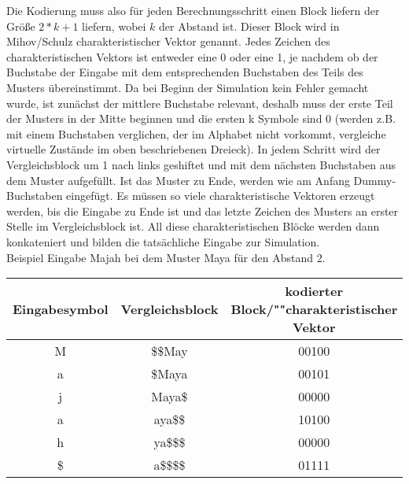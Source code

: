 Die Kodierung muss also für jeden Berechnungsschritt einen Block liefern der Größe $2*k+1$ liefern, wobei $k$ der Abstand ist. Dieser Block wird in Mihov/Schulz charakteristischer Vektor genannt. Jedes Zeichen des charakteristischen Vektors ist entweder eine 0 oder eine 1, je nachdem ob der Buchstabe der Eingabe mit dem entsprechenden Buchstaben des Teils des Musters übereinstimmt. Da bei Beginn der Simulation kein Fehler gemacht wurde, ist zunächst der mittlere Buchstabe relevant, deshalb muss der erste Teil der Musters in der Mitte beginnen und die ersten k Symbole sind 0 (werden z.B. mit einem Buchstaben verglichen, der im Alphabet nicht vorkommt, vergleiche virtuelle Zustände im oben beschriebenen Dreieck). In jedem Schritt wird der Vergleichsblock um 1 nach links geshiftet und mit dem nächsten Buchstaben aus dem Muster aufgefüllt. Ist das Muster zu Ende, werden wie am Anfang Dummy-Buchstaben eingefügt. Es müssen so viele charakteristische Vektoren erzeugt werden, bis die Eingabe zu Ende ist und das letzte Zeichen des Musters an erster Stelle im Vergleichsblock ist. All diese charakteristischen Blöcke werden dann konkateniert und bilden die tatsächliche Eingabe zur Simulation.\\
Beispiel Eingabe Majah bei dem Muster Maya für den Abstand 2.\begin{longtable}{c|c||c}
Eingabesymbol & Vergleichsblock & kodierter Block/""charakteristischer Vektor \\ \hline \endhead
M & \$\$May & 00100 \\
a & \$Maya & 00101 \\ 
j & Maya\$ & 00000 \\
a & aya\$\$ & 10100 \\
h & ya\$\$\$ & 00000 \\
\$ & a\$\$\$\$ & 01111 \\
\end{longtable}

